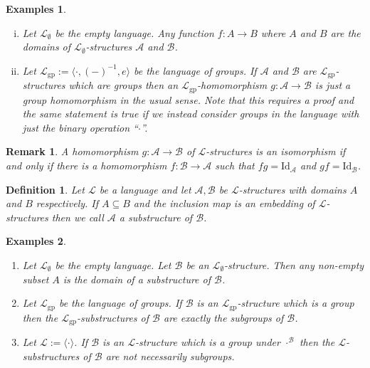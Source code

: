 \documentclass[11pt]{article}
\newtheorem*{remark*}{Remark}
\newtheorem*{examples*}{Examples}
\newtheorem{definition}[theorem]{Definition}
\newcommand{\mcal}[1]{\mathcal{#1}}
\begin{document}
\begin{examples*}
\
\begin{enumerate}[(i)]
\item Let $\mcal{L}_\emptyset$ be the empty language. Any function $f:A\rightarrow B$ where $A$ and $B$ are the domains of $\mcal{L}_\emptyset$-structures $\mcal{A}$ and $\mcal{B}$.
\item Let $\mcal{L}_{\textrm{gp}}:=\langle\cdot,(-)^{-1},e\rangle$ be the language of groups. If $\mcal{A}$ and $\mcal{B}$ are $\mcal{L}_{\textrm{gp}}$-structures which are groups then an $\mcal{L}_{\textrm{gp}}$-homomorphism $g:\mcal{A}\rightarrow \mcal{B}$ is just a group homomorphism in the usual sense. Note that this requires a proof and the same statement is true if we instead consider groups in the language with just the binary operation ``$\cdot$''.
\end{enumerate}
\end{examples*}

\begin{remark*}
A homomorphism $g:\mcal{A}\rightarrow \mcal{B}$ of $\mcal{L}$-structures is an isomorphism if and only if there is a homomorphism $f:\mcal{B}\rightarrow \mcal{A}$ such that $fg=\textrm{Id}_{\mcal{A}}$ and $gf=\textrm{Id}_\mcal{B}$.
\end{remark*}


\begin{definition}

Let $\mcal{L}$ be a language and let $\mcal{A},\mcal{B}$ be $\mcal{L}$-structures with domains $A$ and $B$ respectively. If $A\subseteq B$ and the inclusion map is an embedding of $\mcal{L}$-structures then we call $\mcal{A}$ a substructure of $\mcal{B}$.
\end{definition}

\begin{examples*}
\begin{enumerate}
\item Let $\mcal{L}_\emptyset$ be the empty language. Let $\mcal{B}$ be an $\mcal{L}_\emptyset$-structure. Then any non-empty subset $A$ is the domain of a substructure of $\mcal{B}$.
\item Let $\mcal{L}_{\textrm{gp}}$ be the language of groups. If $\mcal{B}$ is an $\mcal{L}_{\textrm{gp}}$-structure which is a group then the $\mcal{L}_{\textrm{gp}}$-substructures of $\mcal{B}$ are exactly the subgroups of $\mcal{B}$.
\item Let $\mcal{L}:=\langle\cdot\rangle$. If $\mcal{B}$ is an $\mcal{L}$-structure which is a group under $\cdot^{\mcal{B}}$ then the $\mcal{L}$-substructures of $\mcal{B}$ are not necessarily subgroups.
\end{enumerate}
\end{examples*}
\end{document}
